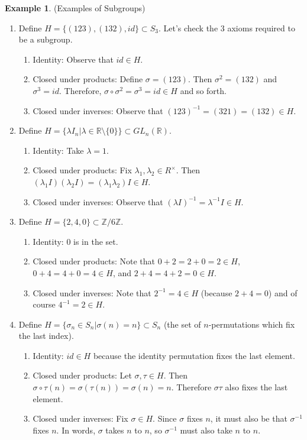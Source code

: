 \documentclass[12pt]{article}
\theoremstyle{definition}
\newtheorem{example}{Example}
\theoremstyle{definition}
\begin{document}
\begin{example}(Examples of Subgroups)
\begin{enumerate}
	\item Define $H = \{ (1 2 3), (1 3 2), id \} \subset S_3$. Let's check the 3 axioms required to be a subgroup.
	\begin{enumerate}
		\item Identity: Observe that $id \in H$.
		\item Closed under products: Define $\sigma = (1 2 3)$. Then $\sigma^2 = (1 3 2)$ and $\sigma^3 = id$. Therefore, $\sigma \circ \sigma^2 = \sigma^3 = id \in H$ and so forth. 
		\item Closed under inverses: Observe that $(1 2 3)^{-1} = (3 2 1) = (1 3 2) \in H$. 
	\end{enumerate}
	\item Define $H = \{ \lambda I_n \vert \lambda \in \mathbb{R} \setminus \{0\} \} \subset GL_n(\mathbb{R})$.
	\begin{enumerate}
		\item Identity: Take $\lambda = 1$.
		\item Closed under products: Fix $\lambda_1, \lambda_2 \in R^{\times}$. Then $(\lambda_1 I)(\lambda_2 I) = (\lambda_1 \lambda_2) I \in H$.
		\item Closed under inverses: Observe that $(\lambda I)^{-1} = \lambda^{-1} I \in H$.
	\end{enumerate}
	\item Define $H = \{2, 4, 0 \} \subset \mathbb{Z} / 6 \mathbb{Z}$.
	\begin{enumerate}
		\item Identity: $0$ is in the set.
		\item Closed under products: Note that $0 + 2 = 2 + 0 = 2 \in H$, $0 + 4 = 4 + 0 = 4 \in H$, and $2 + 4 = 4 + 2 = 0 \in H$.
		\item Closed under inverses: Note that $2^{-1} = 4 \in H$ (because $2 + 4 = 0$) and of course $4^{-1} = 2 \in H$.
	\end{enumerate}
	\item Define $H = \{ \sigma_n \in S_n | \sigma(n) = n \} \subset S_n$ (the set of $n$-permutations which fix the last index).
	\begin{enumerate}
		\item Identity: $id \in H$ because the identity permutation fixes the last element.
		\item Closed under products: Let $\sigma, \tau \in H$. Then $\sigma \circ \tau (n) = \sigma(\tau(n)) = \sigma(n) = n$. Therefore $\sigma \tau$ also fixes the last element.
		\item Closed under inverses: Fix $\sigma \in H$. Since $\sigma$ fixes $n$, it must also be that $\sigma^{-1}$ fixes $n$. In words, $\sigma$ takes $n$ to $n$, so $\sigma^{-1}$ must also take $n$ to $n$.
	\end{enumerate}
\end{enumerate}
\end{example}
\end{document}
